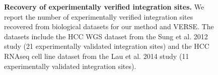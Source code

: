 \documentclass[12pt]{article}
\begin{document}
\begin{figure}[htpb]
  \centering
\caption[Recovery of experimentally verified integration sites from biological datasets.]
{\label{bio_results}  {\bf Recovery of experimentally verified integration sites.}  We report the number of experimentally verified integration sites recovered from biological datasets for our method and VERSE.  The datasets include the HCC WGS dataset from the Sung et al. 2012 study (21 experimentally validated integration sites) and the HCC RNAseq cell line dataset from the Lau et al. 2014 study (11 experimentally validated integration sites).}
\end{figure}


\end{document}
